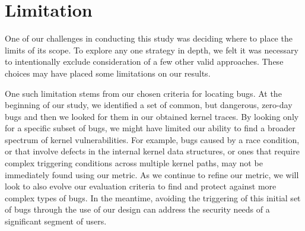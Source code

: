\section{Limitation} 
\label{sec.limitation}

One of our challenges in conducting this study was deciding where to place the
limits of its scope.  To explore any one strategy
in depth, we felt it was necessary to intentionally exclude consideration of
a few other valid approaches. These choices may have placed some limitations on our results.

One such limitation stems from our chosen criteria for locating
bugs. At the beginning
of our study, we identified a set of common, but dangerous, zero-day bugs
and then we looked for them in our obtained kernel traces. By looking only
for a specific subset of bugs, we might have limited our
ability to find a broader spectrum of kernel vulnerabilities. For example, bugs
caused by a race condition, or that involve defects in the internal kernel data
structures, or ones that require complex triggering conditions across multiple kernel
paths, may not be immediately found using our metric. As we continue to refine
our metric, we will look to also evolve our evaluation
criteria to find and protect against more complex types of bugs.
In the meantime, avoiding the triggering of this initial set of bugs
through the use of our \lip design can address the security
needs of a significant segment of users.


